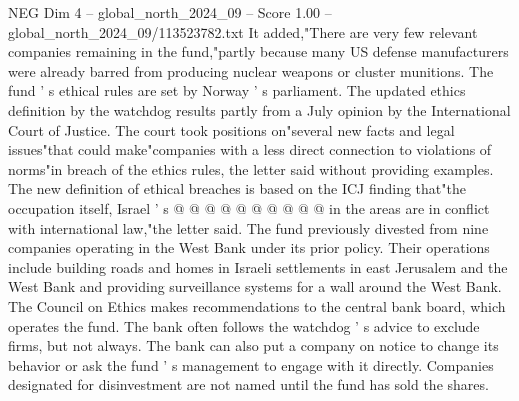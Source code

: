 \begin{textsample}{NEG Dim 4 – global\_north\_2024\_09 – Score 1.00 – global\_north\_2024\_09/113523782.txt}
It added,"There are very few relevant companies remaining in the fund,"partly because many US defense manufacturers were already barred from producing nuclear weapons or cluster munitions.
The fund ' s ethical rules are set by Norway ' s parliament.
The updated ethics definition by the watchdog results partly from a July opinion by the International Court of Justice.
The court took positions on"several new facts and legal issues"that could make"companies with a less direct connection to violations of norms"in breach of the ethics rules, the letter said without providing examples.
The new definition of ethical breaches is based on the ICJ finding that"the occupation itself, Israel ' s @ @ @ @ @ @ @ @ @ @ in the areas are in conflict with international law,"the letter said.
The fund previously divested from nine companies operating in the West Bank under its prior policy.
Their operations include building roads and homes in Israeli settlements in east Jerusalem and the West Bank and providing surveillance systems for a wall around the West Bank.
The Council on Ethics makes recommendations to the central bank board, which operates the fund.
The bank often follows the watchdog ' s advice to exclude firms, but not always.
The bank can also put a company on notice to change its behavior or ask the fund ' s management to engage with it directly.
Companies designated for disinvestment are not named until the fund has sold the shares.

\end{textsample}
